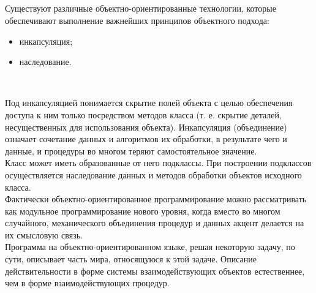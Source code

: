 \

\

\

\

Существуют различные объектно-ориентированные технологии, которые обеспечивают выполнение важнейших принципов объектного подхода: \\

\begin{itemize}
  \item инкапсуляция;
  \item наследование.
\end{itemize}
\

Под инкапсуляцией понимается скрытие полей объекта с целью обеспечения доступа к ним только посредством методов класса (т. е. скрытие деталей, несущественных для использования объекта). Инкапсуляция (объединение) означает сочетание данных и алгоритмов их обработки, в результате чего и данные, и процедуры во многом теряют самостоятельное значение. \\

Класс может иметь образованные от него подклассы. При построении подклассов осуществляется наследование данных и методов обработки объектов исходного класса. \\

Фактически объектно-ориентированное программирование можно рассматривать как модульное программирование нового уровня, когда вместо во многом случайного, механического объединения процедур и данных акцент делается на их смысловую связь. \\

Программа на объектно-ориентированном языке, решая некоторую задачу, по сути, описывает часть мира, относящуюся к этой задаче. Описание действительности в форме системы взаимодействующих объектов естественнее, чем в форме взаимодействующих процедур. \\


